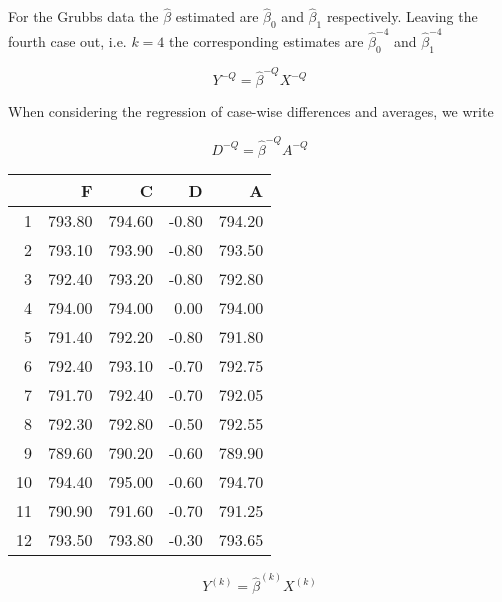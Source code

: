 \documentclass[12pt, a4paper]{report}
\theoremstyle{plain}
\theoremstyle{definition}
\theoremstyle{remark}
\begin{document}
For the Grubbs data the $\hat{\beta}$ estimated are
$\hat{\beta}_{0}$ and $\hat{\beta}_{1}$ respectively. Leaving the
fourth case out, i.e. $k=4$ the corresponding estimates are
$\hat{\beta}_{0}^{-4}$ and $\hat{\beta}_{1}^{-4}$


\begin{equation}
Y^{-Q} = \hat{\beta}^{-Q}X^{-Q}
\end{equation}

When considering the regression of case-wise differences and
averages, we write

\begin{equation}
D^{-Q} = \hat{\beta}^{-Q}A^{-Q}
\end{equation}







\newpage

\begin{table}[ht]
\begin{center}
\begin{tabular}{rrrrr}
  \hline
 & F & C & D & A \\
  \hline
1 & 793.80 & 794.60 & -0.80 & 794.20 \\
  2 & 793.10 & 793.90 & -0.80 & 793.50 \\
  3 & 792.40 & 793.20 & -0.80 & 792.80 \\
  4 & 794.00 & 794.00 & 0.00 & 794.00 \\
  5 & 791.40 & 792.20 & -0.80 & 791.80 \\
  6 & 792.40 & 793.10 & -0.70 & 792.75 \\
  7 & 791.70 & 792.40 & -0.70 & 792.05 \\
  8 & 792.30 & 792.80 & -0.50 & 792.55 \\
  9 & 789.60 & 790.20 & -0.60 & 789.90 \\
  10 & 794.40 & 795.00 & -0.60 & 794.70 \\
  11 & 790.90 & 791.60 & -0.70 & 791.25 \\
  12 & 793.50 & 793.80 & -0.30 & 793.65 \\
   \hline
\end{tabular}
\end{center}
\end{table}


\newpage

\begin{equation}
Y^{(k)} = \hat{\beta}^{(k)}X^{(k)}
\end{equation}
\end{document}
